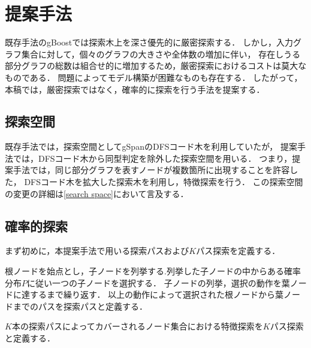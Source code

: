 \chapter{提案手法}
既存手法のgBoostでは探索木上を深さ優先的に厳密探索する．
しかし，入力グラフ集合に対して，個々のグラフの大きさや全体数の増加に伴い，
存在しうる部分グラフの総数は組合せ的に増加するため，厳密探索におけるコストは莫大なものである．
問題によってモデル構築が困難なものも存在する．
したがって，本稿では，厳密探索ではなく，確率的に探索を行う手法を提案する．

\section{探索空間}
既存手法では，探索空間としてgSpan\cite{gSpan}のDFSコード木を利用していたが，
提案手法では，DFSコード木から同型判定を除外した探索空間を用いる．
つまり，提案手法では，同じ部分グラフを表すノードが複数箇所に出現することを許容した，
DFSコード木を拡大した探索木を利用し，特徴探索を行う．
この探索空間の変更の詳細は\ref{search space}において言及する．

\section{確率的探索}
まず初めに，本提案手法で用いる探索パスおよび$K$パス探索を定義する．
\begin{Definition}[探索パス]
	根ノードを始点とし，子ノードを列挙する.列挙した子ノードの中からある確率分布$P$に従い一つの子ノードを選択する．
	子ノードの列挙，選択の動作を葉ノードに達するまで繰り返す．
	以上の動作によって選択された根ノードから葉ノードまでのパスを探索パスと定義する．
\end{Definition}
\begin{Definition}[$K$パス探索]
	$K$本の探索パスによってカバーされるノード集合における特徴探索を$K$パス探索と定義する．
\end{Definition}

